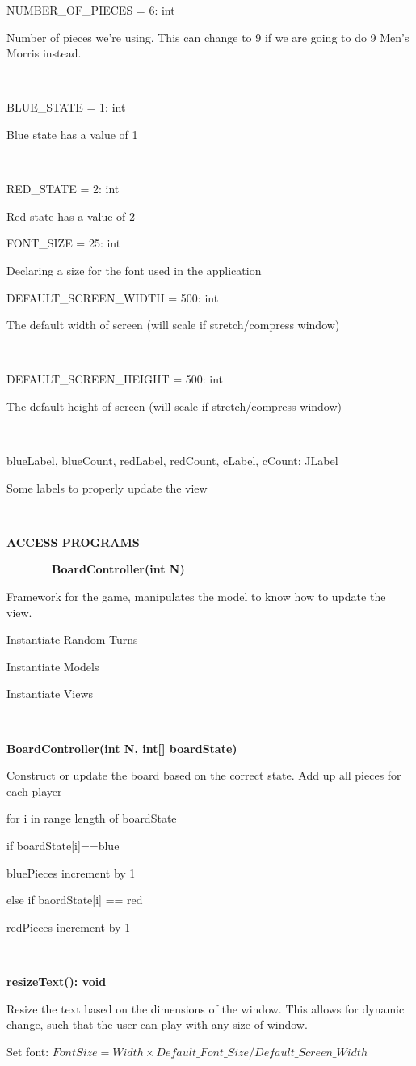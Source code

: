 \documentclass{article}
\begin{document}
{{}

{NUMBER\_OF\_PIECES = 6: int}

{Number of pieces we're using. This can change to 9 if we are going to
do 9 Men's Morris instead.}

{~~~~~~~~}

{BLUE\_STATE = 1: int}

{Blue state has a value of 1}

{~~~~~~~~}

{RED\_STATE = 2: int}

{Red state has a value of 2}

{}

{FONT\_SIZE = 25: int}

{Declaring a size for the font used in the application}

{}

{DEFAULT\_SCREEN\_WIDTH = 500: int }

{The default width of screen (will scale if stretch/compress window)}

{~~~~~~~~}

{DEFAULT\_SCREEN\_HEIGHT = 500: int}

{The default height of screen (will scale if stretch/compress window)}

{~}

{blueLabel, blueCount, redLabel, redCount, cLabel, cCount:
JLabel}

{Some labels to properly update the view}

{}

{~~~~~~~~}

{\textbf{ACCESS PROGRAMS}}

{~~~~~~~~\textbf{BoardController(int N) }}

{Framework for the game, manipulates the model to know how to update the
view. }

{Instantiate Random Turns}

{Instantiate Models}

{Instantiate Views}

{}

{~~~~~~~~~~~~~~~~}

{\textbf{BoardController(int N, int{[}{]} boardState)}}

{Construct or update the board based on the correct state. }{Add up all
pieces for each player}

{for i in range length of boardState}

{if boardState{[}i{]}==blue}

{bluePieces increment by 1}

{else if baordState{[}i{]} == red}

{redPieces increment by 1}{~~~~~~~~~~~~~~~~}

{~}

{\textbf{resizeText(): void}}

{Resize the text based on the dimensions of the window. This allows for dynamic change, such that the user can play with any size of window}{.}

{Set font: \(Font Size = Width \times Default\_Font\_Size / Default\_Screen\_Width\)}}
\end{document}
